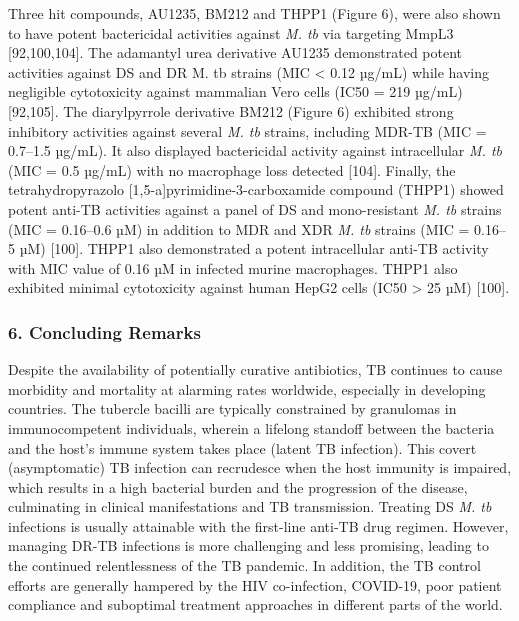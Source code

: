 \documentclass{article}
\begin{document}
Three hit compounds, AU1235, BM212 and THPP1 (Figure 6), were also shown to have potent bactericidal activities against \textit{M. tb} via targeting MmpL3 [92,100,104]. The adamantyl urea derivative AU1235 demonstrated potent activities against DS and DR M. tb strains (MIC < 0.12 µg/mL) while having negligible cytotoxicity against mammalian Vero cells (IC50 = 219 µg/mL) [92,105]. The diarylpyrrole derivative BM212 (Figure 6) exhibited strong inhibitory activities against several \textit{M. tb} strains, including MDR-TB (MIC = 0.7–1.5 µg/mL). It also displayed bactericidal activity against intracellular \textit{M. tb} (MIC = 0.5 µg/mL) with no macrophage loss detected [104]. Finally, the tetrahydropyrazolo [1,5-a]pyrimidine-3-carboxamide compound (THPP1) showed potent anti-TB activities against a panel of DS and mono-resistant \textit{M. tb} strains (MIC = 0.16–0.6 µM) in addition to MDR and XDR \textit{M. tb} strains (MIC = 0.16–5 µM) [100]. THPP1 also demonstrated a potent intracellular anti-TB activity with MIC value of 0.16 µM in infected murine macrophages. THPP1 also exhibited minimal cytotoxicity against human HepG2 cells (IC50 > 25 µM) [100].

\subsubsection{\textbf{6. Concluding Remarks}}

Despite the availability of potentially curative antibiotics, TB continues to cause morbidity and mortality at alarming rates worldwide, especially in developing countries. The tubercle bacilli are typically constrained by granulomas in immunocompetent individuals, wherein a lifelong standoff between the bacteria and the host's immune system takes place (latent TB infection). This covert (asymptomatic) TB infection can recrudesce when the host immunity is impaired, which results in a high bacterial burden and the progression of the disease, culminating in clinical manifestations and TB transmission. Treating DS \textit{M. tb} infections is usually attainable with the first-line anti-TB drug regimen. However, managing DR-TB infections is more challenging and less promising, leading to the continued relentlessness of the TB pandemic. In addition, the TB control efforts are generally hampered by the HIV co-infection, COVID-19, poor patient compliance and suboptimal treatment approaches in different parts of the world.
\end{document}
